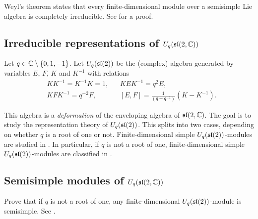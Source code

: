 Weyl's theorem states that every finite-dimensional module over
a semisimple Lie algebra is completely irreducible. 
See \cite[Theorem 17.4]{MR2218355} for a proof. 

\subsection*{Irreducible representations of $U_q(\sl(2,\C))$}

Let $q\in\C\setminus\{0,1,-1\}$. 
Let $U_q(\sl(2))$ be the (complex) algebra generated by 
variables $E$, $F$, $K$ and $K^{-1}$ with relations
\begin{align*}
    &KK^{-1}=K^{-1}K=1,
    &&
    KEK^{-1}=q^2E,\\
    &
    KFK^{-1}=q^{-2}F,
    &&
    [E,F]=\frac{1}{(q-q^{-1})}(K-K^{-1}).
\end{align*}

This algebra is a \emph{deformation} of the enveloping algebra
of $\sl(2,\C)$. The goal is to study the 
representation theory of $U_q(\sl(2))$. This splits into
two cases, depending on whether $q$ is a root of one or not. 
Finite-dimensional simple $U_q(\sl(2))$-modules are studied 
in \cite[VI]{MR1321145}. In particular, if 
$q$ is not a root of one, finite-dimensional simple $U_q(\sl(2))$-modules
are classified in \cite[Theorem VI.3.5]{MR1321145}. 

\subsection*{Semisimple modules of $U_q(\sl(2,\C))$}

Prove that if $q$ is not a root of one, any finite-dimensional
$U_q(\sl(2))$-module is semisimple. 
See \cite[Theorem VII.2.2]{MR1321145}. 